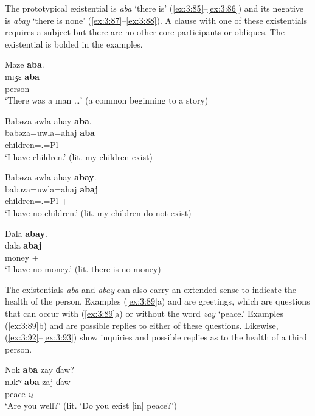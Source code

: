 The prototypical existential is \textit{aba} ‘there is’ (\ref{ex:3:85}--\ref{ex:3:86}) and its negative is \textit{abay} ‘there is none’ (\ref{ex:3:87}--\ref{ex:3:88}). A clause with one of these existentials requires a subject but there are no other core participants or obliques. The existential is bolded in the examples. 

\ea \label{ex:3:85}
{Məze}  \textbf{aba}.\\
\gll mɪʒɛ \textbf{aba} \\
      person  {\EXT}\\
\glt ‘There was a man \ldots' (a common beginning to a story)
\z

\ea \label{ex:3:86}
Babəza  əwla  ahay  \textbf{aba}.\\
\gll  babəza=uwla=ahaj  \textbf{aba}\\
      children={\oneS}.{\POSS}=Pl  {\EXT}\\
\glt  ‘I have children.’ (lit. my children exist)
\z

\ea \label{ex:3:87}
Babəza  əwla  ahay  \textbf{abay}.\\
\gll  babəza=uwla=ahaj  \textbf{abaj}\\
      children={\oneS}.{\POSS}=Pl  {\EXT}+{\NEG}\\
\glt  ‘I have no children.’  (lit. my children do not exist)
\z

\ea \label{ex:3:88}
Dala  \textbf{abay}.\\
\gll  dala    \textbf{abaj}\\
      money  {\EXT}+{\NEG}\\
\glt  ‘I have no money.’ (lit. there is no money)
\z

The existentials \textit{aba} and \textit{abay} can also carry an extended sense to indicate the health of the person. Examples (\ref{ex:3:89}a) and  are greetings, which are questions that can occur with (\ref{ex:3:89}a) or without  the word \textit{zay} ‘peace.’ Examples (\ref{ex:3:89}b) and  are possible replies to either of these questions. Likewise, (\ref{ex:3:92}--\ref{ex:3:93}) show inquiries and possible replies as to the health of a third person.

\ea \label{ex:3:89}
\ea Nok \textbf{aba} zay ɗaw? \\
\gll nɔkʷ  \textbf{aba}    zaj  ɗaw        \\
      {\twoS}    {\EXT}    peace  {\textsc{q}}       \\
\glt  ‘Are you well?’ (lit. ‘Do you exist [in] peace?’)\\

